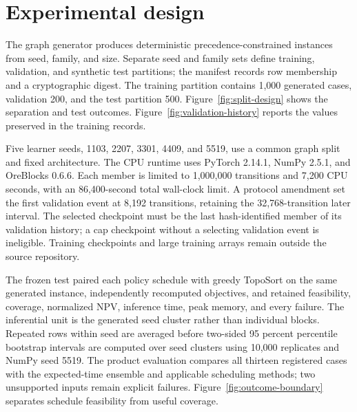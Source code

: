 \documentclass[11pt]{article}
\begin{document}
\section{Experimental design}
The graph generator produces deterministic precedence-constrained instances from seed, family, and size. Separate seed and family sets define training, validation, and synthetic test partitions; the manifest records row membership and a cryptographic digest. The training partition contains 1,000 generated cases, validation 200, and the test partition 500. Figure~\ref{fig:split-design} shows the separation and test outcomes. Figure~\ref{fig:validation-history} reports the values preserved in the training records.

Five learner seeds, 1103, 2207, 3301, 4409, and 5519, use a common graph split and fixed architecture. The CPU runtime uses PyTorch 2.14.1, NumPy 2.5.1, and OreBlocks 0.6.6. Each member is limited to 1,000,000 transitions and 7,200 CPU seconds, with an 86,400-second total wall-clock limit. A protocol amendment set the first validation event at 8,192 transitions, retaining the 32,768-transition later interval. The selected checkpoint must be the last hash-identified member of its validation history; a cap checkpoint without a selecting validation event is ineligible. Training checkpoints and large training arrays remain outside the source repository.

The frozen test paired each policy schedule with greedy TopoSort on the same generated instance, independently recomputed objectives, and retained feasibility, coverage, normalized NPV, inference time, peak memory, and every failure. The inferential unit is the generated seed cluster rather than individual blocks. Repeated rows within seed are averaged before two-sided 95 percent percentile bootstrap intervals are computed over seed clusters using 10,000 replicates and NumPy seed 5519. The product evaluation compares all thirteen registered cases with the expected-time ensemble and applicable scheduling methods; two unsupported inputs remain explicit failures. Figure~\ref{fig:outcome-boundary} separates schedule feasibility from useful coverage.
\end{document}

